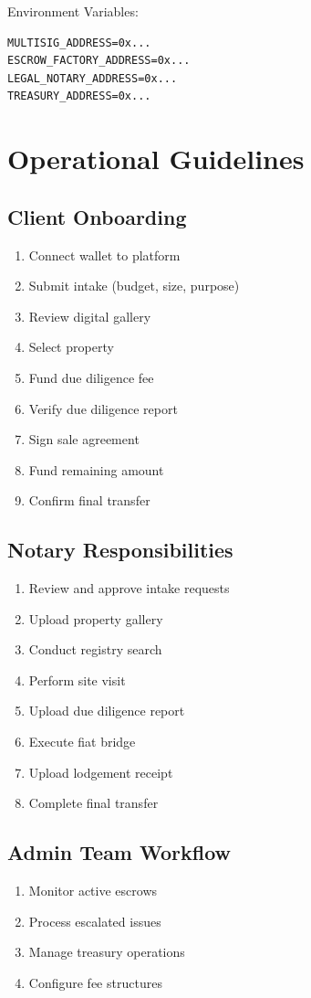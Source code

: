 \documentclass[12pt,a4paper]{article}
\begin{document}
Environment Variables:
\begin{verbatim}
MULTISIG_ADDRESS=0x...
ESCROW_FACTORY_ADDRESS=0x...
LEGAL_NOTARY_ADDRESS=0x...
TREASURY_ADDRESS=0x...
\end{verbatim}

\section{Operational Guidelines}

\subsection{Client Onboarding}
\begin{enumerate}
\item Connect wallet to platform
\item Submit intake (budget, size, purpose)
\item Review digital gallery
\item Select property
\item Fund due diligence fee
\item Verify due diligence report
\item Sign sale agreement
\item Fund remaining amount
\item Confirm final transfer
\end{enumerate}

\subsection{Notary Responsibilities}
\begin{enumerate}
\item Review and approve intake requests
\item Upload property gallery
\item Conduct registry search
\item Perform site visit
\item Upload due diligence report
\item Execute fiat bridge
\item Upload lodgement receipt
\item Complete final transfer
\end{enumerate}

\subsection{Admin Team Workflow}
\begin{enumerate}
\item Monitor active escrows
\item Process escalated issues
\item Manage treasury operations
\item Configure fee structures
\end{enumerate}
\end{document}
